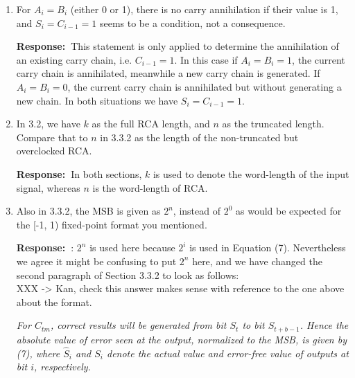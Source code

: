 \documentclass[a4paper, 11pt]{article}
\def\Response{\noindent \textbf{Response:~}}
\newcommand{\Question}[1]{\textcolor[rgb]{0.51,0.00,0.00}{#1}}
\newcommand{\PaperText}[1]{\emph{#1}}
\begin{document}
\begin{enumerate}
      \Response Thanks for pointing this out. In this case it should be $C_{i-1} =1$, because carry is propagated from bit $i-1$ to bit $i$. Hence $S_i=A_i+B_i+C_{i-1}=0$.
      
      This statement is modified as follows:\\
      
      \PaperText{Carry propagation: $A_i\neq B_i$, the carry propagates for this carry at bit $i$, and $C_{i-1}=1$, $S_i=0$.}\\
      
  \item \Question{For $A_i = B_i$ (either 0 or 1), there is no carry annihilation if their value is 1, and $S_i = C_{i-1} = 1$ seems to be a condition, not a consequence.}
      
      \Response This statement is only applied to determine the annihilation of an existing carry chain, i.e. $C_{i-1}=1$. In this case if $A_i=B_i=1$, the current carry chain is annihilated, meanwhile a new carry chain is generated. If $A_i=B_i=0$, the current carry chain is annihilated but without generating a new chain. In both situations we have $S_i=C_{i-1}=1$.

  \item \Question{In 3.2, we have $k$ as the full RCA length, and $n$ as the truncated length.  Compare that to $n$ in 3.3.2 as the length of the non-truncated but overclocked RCA.}
      
      \Response In both sections, $k$ is used to denote the word-length of the input signal, whereas $n$ is the word-length of RCA.
      
  \item \Question{Also in 3.3.2, the MSB is given as $2^n$, instead of $2^0$ as would be expected for the [-1, 1) fixed-point format you mentioned.}
      
      \Response : $2^n$ is used here because $2^i$ is used in Equation (7). Nevertheless we agree it might be confusing to put $2^n$ here, and we have changed the second paragraph of Section 3.3.2 to look as follows:\\
      
 XXX -> Kan, check this answer makes sense with reference to the one above about the format.
      
      \PaperText{For $C_{tm}$, correct results will be generated from bit $S_t$ to bit $S_{t+b-1}$. Hence the absolute value of error seen at the output, normalized to the MSB, is given by (7), where $\hat{S}_i$ and $S_i$ denote the actual value and error-free value of outputs at bit $i$, respectively.}\\
      

\end{enumerate}
\end{document}
